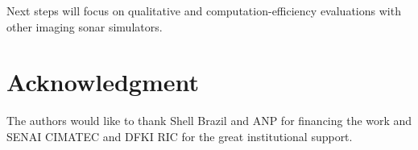 \documentclass[final,5p,times]{elsarticle}
\begin{document}
Next steps will focus on qualitative and computation-efficiency evaluations with other imaging sonar simulators.




\section*{Acknowledgment}
%
The authors would like to thank Shell Brazil and ANP for financing the work and SENAI CIMATEC and DFKI RIC for the great institutional support.










\end{document}
